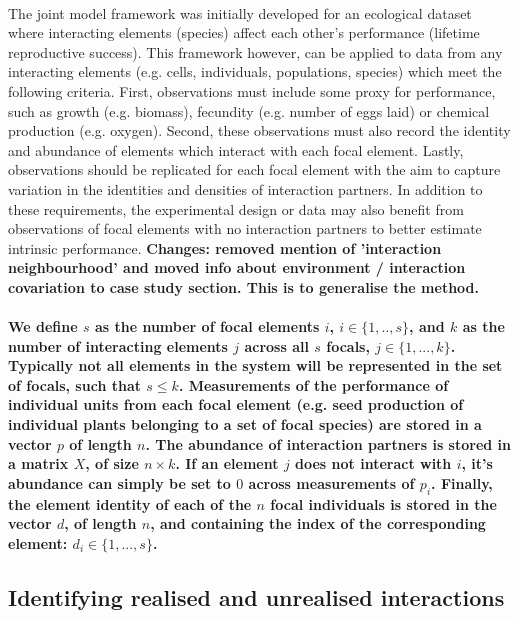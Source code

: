 \documentclass[a4,12pt]{article}
\begin{document}
    \paragraph{}
    The joint model framework was initially developed for an ecological dataset where interacting elements (species) affect each other's performance (lifetime reproductive success). This framework however, can be applied to data from any interacting elements (e.g. cells, individuals, populations, species) which meet the following criteria. First, observations must include some proxy for performance, such as growth (e.g. biomass), fecundity (e.g. number of eggs laid) or chemical production (e.g. oxygen). Second, these observations must also record the identity and abundance of elements which interact with each focal element. Lastly, observations should be replicated for each focal element with the aim to capture variation in the identities and densities of interaction partners. In addition to these requirements, the experimental design or data may also benefit from observations of focal elements with no interaction partners to better estimate intrinsic performance. \textbf{Changes: removed mention of 'interaction neighbourhood' and moved info about environment / interaction covariation to case study section. This is to generalise the method.}

    \paragraph{}
    \textbf{
    We define $s$ as the number of focal elements $i$, $i \in \{ 1, .., s \}$, and $k$ as the number of interacting elements $j$ across all $s$ focals, $j \in \{1, ..., k \}$. Typically not all elements in the system will be represented in the set of focals, such that $s \le k$. Measurements of the performance of individual units from each focal element (e.g. seed production of individual plants belonging to a set of focal species) are stored in a vector $p$ of length $n$. The abundance of interaction partners is stored in a matrix $X$, of size $n \times k$. If an element $j$ does not interact with $i$, it's abundance can simply be set to $0$ across measurements of $p_i$. Finally, the element identity of each of the $n$ focal individuals is stored in the vector $d$, of length $n$, and containing the index of the corresponding element: $d_i \in \{1, ..., s \}$.}


    \subsection{Identifying realised and unrealised interactions}
    \label{meth:id_params}
\end{document}
